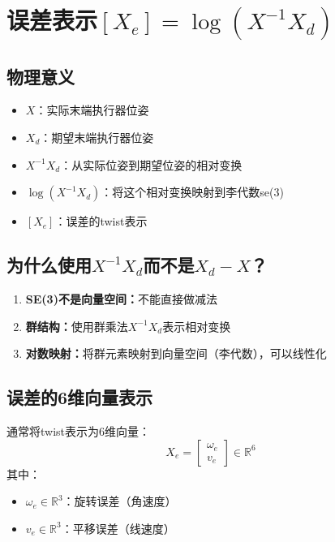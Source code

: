 \documentclass[12pt,a4paper]{article}
\begin{document}
\section{误差表示$[X_e] = \log(X^{-1} X_d)$}

\subsection{物理意义}

\begin{itemize}
\item $X$：实际末端执行器位姿
\item $X_d$：期望末端执行器位姿
\item $X^{-1} X_d$：从实际位姿到期望位姿的相对变换
\item $\log(X^{-1} X_d)$：将这个相对变换映射到李代数se(3)
\item $[X_e]$：误差的twist表示
\end{itemize}

\subsection{为什么使用$X^{-1} X_d$而不是$X_d - X$？}

\begin{enumerate}
\item \textbf{SE(3)不是向量空间：}不能直接做减法
\item \textbf{群结构：}使用群乘法$X^{-1} X_d$表示相对变换
\item \textbf{对数映射：}将群元素映射到向量空间（李代数），可以线性化
\end{enumerate}

\subsection{误差的6维向量表示}

通常将twist表示为6维向量：
\begin{equation}
X_e = \begin{bmatrix} \omega_e \\ v_e \end{bmatrix} \in \mathbb{R}^6
\end{equation}
其中：
\begin{itemize}
\item $\omega_e \in \mathbb{R}^3$：旋转误差（角速度）
\item $v_e \in \mathbb{R}^3$：平移误差（线速度）
\end{itemize}
\end{document}
